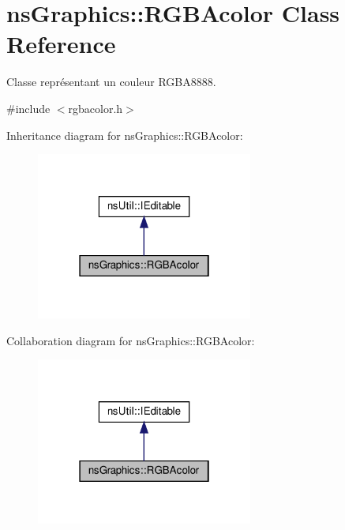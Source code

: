 \hypertarget{classns_graphics_1_1_r_g_b_acolor}{}\section{ns\+Graphics\+:\+:R\+G\+B\+Acolor Class Reference}
\label{classns_graphics_1_1_r_g_b_acolor}


Classe représentant un couleur R\+G\+B\+A8888.  




{\ttfamily \#include $<$rgbacolor.\+h$>$}



Inheritance diagram for ns\+Graphics\+:\+:R\+G\+B\+Acolor\+:
\nopagebreak
\begin{figure}[H]
\begin{center}
\leavevmode
\includegraphics[width=202pt]{classns_graphics_1_1_r_g_b_acolor__inherit__graph}
\end{center}
\end{figure}


Collaboration diagram for ns\+Graphics\+:\+:R\+G\+B\+Acolor\+:
\nopagebreak
\begin{figure}[H]
\begin{center}
\leavevmode
\includegraphics[width=202pt]{classns_graphics_1_1_r_g_b_acolor__coll__graph}
\end{center}
\end{figure}
